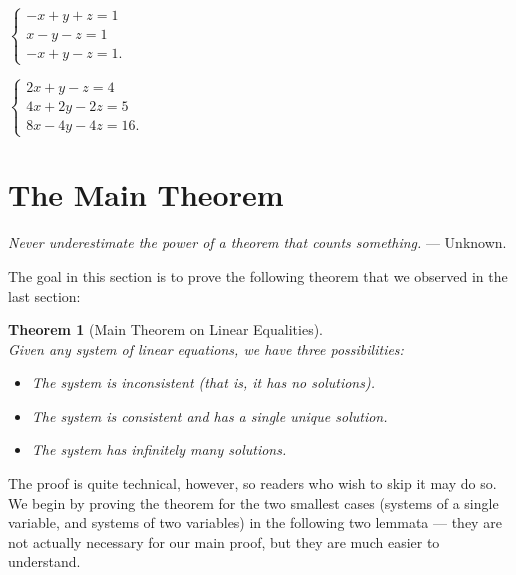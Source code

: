 \documentclass[a4paper,leqno]{article}
\numberwithin{equation}{section}
\newtheorem{thm}[equation]{Theorem}
\theoremstyle{definition}
\theoremstyle{remark}
\begin{document}
\begin{enumerate}
\begin{center}
\begin{enumerate*}
        \item
          $ \displaystyle
            \begin{cases}
              - x + y + z = 1\\
              x - y - z = 1\\
              -x + y - z = 1.
            \end{cases}
          $\hspace*{\fill}
        \item
          $ \displaystyle
            \begin{cases}
              2x + y - z = 4\\
              4x + 2y - 2z = 5\\
              8x - 4y - 4z = 16.
            \end{cases}
          $\hspace*{\fill}
      \end{enumerate*}
    \end{center}
\end{enumerate}

\section{The Main Theorem}
\begin{center}
  \emph{Never underestimate the power of a theorem that counts something.}  --- Unknown.
\end{center}
The goal in this section is to prove the following theorem that we observed in the last section:
\begin{thm}[Main Theorem on Linear Equalities]\ \\
  Given any system of linear equations, we have three possibilities:
  \begin{itemize}
    \item The system is inconsistent (that is, it has no solutions).
    \item The system is consistent and has a single unique solution.
    \item The system has infinitely many solutions.
  \end{itemize}
\end{thm}

The proof is quite technical, however, so readers who wish to skip it may do so. We begin by proving the theorem for the two smallest cases (systems
of a single variable, and systems of two variables) in the following two lemmata --- they are not actually necessary for our main proof, but they are
much easier to understand.
\end{document}
